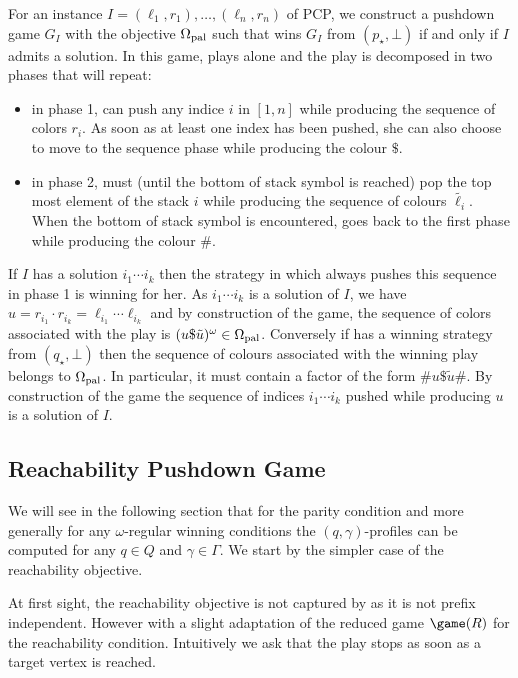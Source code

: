 \begin{remark}
For an instance $I=(\ell_1,r_1),\ldots,(\ell_n,r_n)$ of PCP, we construct a pushdown game $G_I$  with the objective $\Omega_{\textrm{pal}}$ such that \Eve wins $G_I$ from $(p_\star,\bot)$ if and only if $I$ admits a solution. In this game, \Eve plays alone and the play is decomposed in two phases that will repeat:
\begin{itemize}
\item in phase 1, \Eve can push any indice $i$ in $[1,n]$	while producing the sequence of colors $r_i$. As soon as at least one index has been pushed, she can also choose to move to the sequence phase while producing the colour $\$$.
\item in phase 2, \Eve must (until the bottom of stack symbol is reached) pop the top most element of the stack $i$ while producing the sequence of colours $\tilde{\ell_i}$. When the bottom of stack symbol is encountered, \Eve goes back to the first phase while producing the colour $\#$.
\end{itemize}

If $I$ has a solution $i_1 \cdots i_k$ then the strategy in which \Eve always pushes this sequence in phase 1 is winning for her. As $i_1 \cdots i_k$ is a solution of $I$,
we have $u=r_{i_1}\cdot r_{i_k}=\ell_{i_1}\cdots\ell_{i_k} $ and by construction of the game, the sequence of colors associated with the play is $(u\$\tilde{u})^\omega \in \Omega_{\textrm{pal}}$. Conversely if \Eve has a winning strategy from $(q_\star,\bot)$ then the sequence of colours associated with the winning play belongs to $\Omega_{\textrm{pal}}$. In particular, it must contain a factor of the form $\#u\$\tilde{u}\#$. By construction of the game the sequence of indices $i_1 \cdots i_k$ pushed while producing $u$ is a solution of $I$.
\end{remark}



\subsection{Reachability Pushdown Game}

We will see in the following section that for the parity condition and more generally for any $\omega$-regular winning conditions the $(q,\gamma)$-profiles can be computed for any $q \in Q$ and $\gamma \in \Gamma$. We start by the simpler case of the reachability objective.

At first sight, the reachability objective is not captured by  as it is not prefix independent. However with a slight adaptation of the reduced game $\game(R)$   for the reachability condition. Intuitively we ask that the play stops as soon as a target vertex is reached.

